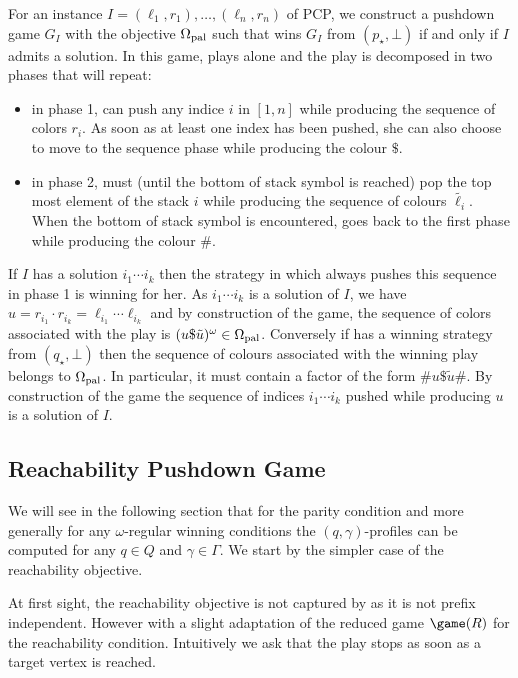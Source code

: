 \begin{remark}
For an instance $I=(\ell_1,r_1),\ldots,(\ell_n,r_n)$ of PCP, we construct a pushdown game $G_I$  with the objective $\Omega_{\textrm{pal}}$ such that \Eve wins $G_I$ from $(p_\star,\bot)$ if and only if $I$ admits a solution. In this game, \Eve plays alone and the play is decomposed in two phases that will repeat:
\begin{itemize}
\item in phase 1, \Eve can push any indice $i$ in $[1,n]$	while producing the sequence of colors $r_i$. As soon as at least one index has been pushed, she can also choose to move to the sequence phase while producing the colour $\$$.
\item in phase 2, \Eve must (until the bottom of stack symbol is reached) pop the top most element of the stack $i$ while producing the sequence of colours $\tilde{\ell_i}$. When the bottom of stack symbol is encountered, \Eve goes back to the first phase while producing the colour $\#$.
\end{itemize}

If $I$ has a solution $i_1 \cdots i_k$ then the strategy in which \Eve always pushes this sequence in phase 1 is winning for her. As $i_1 \cdots i_k$ is a solution of $I$,
we have $u=r_{i_1}\cdot r_{i_k}=\ell_{i_1}\cdots\ell_{i_k} $ and by construction of the game, the sequence of colors associated with the play is $(u\$\tilde{u})^\omega \in \Omega_{\textrm{pal}}$. Conversely if \Eve has a winning strategy from $(q_\star,\bot)$ then the sequence of colours associated with the winning play belongs to $\Omega_{\textrm{pal}}$. In particular, it must contain a factor of the form $\#u\$\tilde{u}\#$. By construction of the game the sequence of indices $i_1 \cdots i_k$ pushed while producing $u$ is a solution of $I$.
\end{remark}



\subsection{Reachability Pushdown Game}

We will see in the following section that for the parity condition and more generally for any $\omega$-regular winning conditions the $(q,\gamma)$-profiles can be computed for any $q \in Q$ and $\gamma \in \Gamma$. We start by the simpler case of the reachability objective.

At first sight, the reachability objective is not captured by  as it is not prefix independent. However with a slight adaptation of the reduced game $\game(R)$   for the reachability condition. Intuitively we ask that the play stops as soon as a target vertex is reached.

